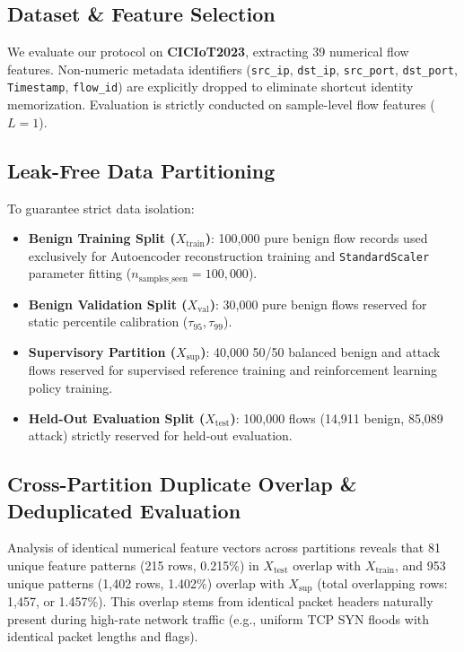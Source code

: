 \documentclass[journal]{IEEEtran}
\begin{document}
\subsection{Dataset \& Feature Selection}
We evaluate our protocol on \textbf{CICIoT2023}, extracting 39 numerical flow features. Non-numeric metadata identifiers (\texttt{src\_ip}, \texttt{dst\_ip}, \texttt{src\_port}, \texttt{dst\_port}, \texttt{Timestamp}, \texttt{flow\_id}) are explicitly dropped to eliminate shortcut identity memorization. Evaluation is strictly conducted on sample-level flow features ($L=1$).

\subsection{Leak-Free Data Partitioning}
To guarantee strict data isolation:
\begin{itemize}
    \item \textbf{Benign Training Split ($X_{\text{train}}$)}: 100,000 pure benign flow records used exclusively for Autoencoder reconstruction training and \texttt{StandardScaler} parameter fitting ($n_{\text{samples\_seen}} = 100,000$).
    \item \textbf{Benign Validation Split ($X_{\text{val}}$)}: 30,000 pure benign flows reserved for static percentile calibration ($\tau_{95}, \tau_{99}$).
    \item \textbf{Supervisory Partition ($X_{\text{sup}}$)}: 40,000 50/50 balanced benign and attack flows reserved for supervised reference training and reinforcement learning policy training.
    \item \textbf{Held-Out Evaluation Split ($X_{\text{test}}$)}: 100,000 flows (14,911 benign, 85,089 attack) strictly reserved for held-out evaluation.
\end{itemize}

\subsection{Cross-Partition Duplicate Overlap \& Deduplicated Evaluation}
Analysis of identical numerical feature vectors across partitions reveals that 81 unique feature patterns (215 rows, 0.215\%) in $X_{\text{test}}$ overlap with $X_{\text{train}}$, and 953 unique patterns (1,402 rows, 1.402\%) overlap with $X_{\text{sup}}$ (total overlapping rows: 1,457, or 1.457\%). This overlap stems from identical packet headers naturally present during high-rate network traffic (e.g., uniform TCP SYN floods with identical packet lengths and flags).
\end{document}
